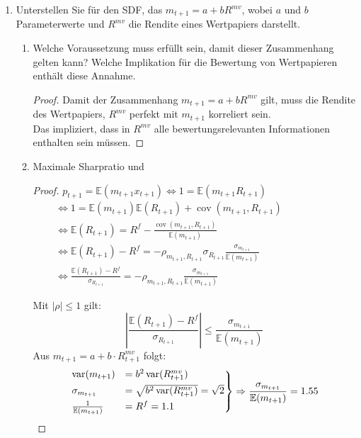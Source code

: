 \documentclass[12pt]{extreport} %
\theoremstyle{named}
\theoremstyle{nnamed}
\theoremstyle{itshape}
\theoremstyle{normal}
\begin{document}
\begin{enumerate}
	\item Unterstellen Sie für den SDF, das $m_{t+1} = a + b R^{mv}$, wobei $a$ und $b$ Parameterwerte und $R^{mv}$ die Rendite eines Wertpapiers darstellt.
		\begin{enumerate}
			\item Welche Voraussetzung muss erfüllt sein, damit dieser Zusammenhang gelten kann? Welche Implikation für die Bewertung von Wertpapieren enthält diese Annahme.
				\begin{proof}
					Damit der Zusammenhang $m_{t+1} = a + b R^{mv}$ gilt, muss die Rendite des Wertpapiers, $R^{mv}$ perfekt mit $m_{t+1}$ korreliert sein. ~\\
					Das impliziert, dass in $R^{mv}$ alle bewertungsrelevanten Informationen enthalten sein müssen.
				\end{proof}
			\item Maximale Sharpratio und
				\begin{proof}
					$p_{t+1} = \mathbb{E}(m_{t+1} x_{t+1}) \iff 1 = \mathbb{E}(m_{t+1} R_{t+1})$
					\begin{align*}
						& \iff 1 = \mathbb{E}(m_{t+1}) \mathbb{E}(R_{t+1}) + \operatorname{cov}(m_{t+1}, R_{t+1}) \qquad \qquad \qquad \\
						& \iff \mathbb{E}(R_{t+1}) = R^f - \frac{\operatorname{cov}(m_{t+1}, R_{t+1})}{\mathbb{E}(m_{t+1})}  \\
						& \iff \mathbb{E}(R_{t+1}) - R^f = - \rho_{m_{t+1}, R_{t+1}} \sigma_{R_{t+1}} \frac{\sigma_{m_{t+1}}}{\mathbb{E}(m_{t+1})} \\
						& \iff \frac{\mathbb{E}(R_{t+1}) - R^f}{\sigma_{R_{t+1}}} = -\rho_{m_{t+1}, R_{t+1}} \frac{\sigma_{m_{t+1}}}{\mathbb{E}(m_{t+1})} 
					\end{align*}
					
					Mit $|\rho| \leq 1$ gilt:
					$$ \left| \frac{\mathbb{E}(R_{t+1}) - R^f}{\sigma_{R_{t+1}}} \right| \leq \frac{\sigma_{m_{t+1}}}{\mathbb{E}(m_{t+1})}$$
					Aus $m_{t+1} = a + b \cdot R^{mv}_{t+1}$ folgt:
					$$
					  \begin{rcases}
						\operatorname{var}(m_{t+1}) & = b^2 \operatorname{var}(R_{t+1}^{mv}) \\
						\sigma_{m_{t+1}} & = \sqrt{b^2 \operatorname{var}(R_{t+1}^{mv})} = \sqrt{2} \\
						\frac{1}{\mathbb{E}(m_{t+1})}& = R^f = 1.1
					  \end{rcases} \Rightarrow \frac{\sigma_{m_{t+1}}}{\mathbb{E}(m_{t+1})} = 1.55 
					$$
				\end{proof}
		\end{enumerate}
\end{enumerate}
\end{document}
